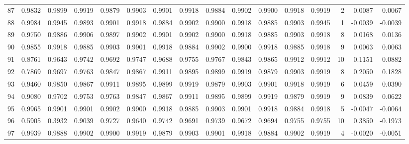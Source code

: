 \begin{tabular}{lrrrrrrrrrrrrrrr}
87  &      0.9832 &  0.9899 &  0.9919 &  0.9879 &  0.9903 &  0.9901 &  0.9918 &  0.9884 &  0.9902 &  0.9900 &   0.9918 &     0.9919 &      2 &                    0.0087 &                     0.0067 \\
88  &      0.9984 &  0.9945 &  0.9893 &  0.9901 &  0.9918 &  0.9884 &  0.9902 &  0.9900 &  0.9918 &  0.9885 &   0.9903 &     0.9945 &      1 &                   -0.0039 &                    -0.0039 \\
89  &      0.9750 &  0.9886 &  0.9906 &  0.9897 &  0.9902 &  0.9901 &  0.9902 &  0.9900 &  0.9918 &  0.9885 &   0.9903 &     0.9918 &      8 &                    0.0168 &                     0.0136 \\
90  &      0.9855 &  0.9918 &  0.9885 &  0.9903 &  0.9901 &  0.9918 &  0.9884 &  0.9902 &  0.9900 &  0.9918 &   0.9885 &     0.9918 &      9 &                    0.0063 &                     0.0063 \\
91  &      0.8761 &  0.9643 &  0.9742 &  0.9692 &  0.9747 &  0.9688 &  0.9755 &  0.9767 &  0.9843 &  0.9865 &   0.9912 &     0.9912 &     10 &                    0.1151 &                     0.0882 \\
92  &      0.7869 &  0.9697 &  0.9763 &  0.9847 &  0.9867 &  0.9911 &  0.9895 &  0.9899 &  0.9919 &  0.9879 &   0.9903 &     0.9919 &      8 &                    0.2050 &                     0.1828 \\
93  &      0.9460 &  0.9850 &  0.9867 &  0.9911 &  0.9895 &  0.9899 &  0.9919 &  0.9879 &  0.9903 &  0.9901 &   0.9918 &     0.9919 &      6 &                    0.0459 &                     0.0390 \\
94  &      0.9080 &  0.9702 &  0.9753 &  0.9763 &  0.9847 &  0.9867 &  0.9911 &  0.9895 &  0.9899 &  0.9919 &   0.9879 &     0.9919 &      9 &                    0.0839 &                     0.0622 \\
95  &      0.9965 &  0.9901 &  0.9901 &  0.9902 &  0.9900 &  0.9918 &  0.9885 &  0.9903 &  0.9901 &  0.9918 &   0.9884 &     0.9918 &      5 &                   -0.0047 &                    -0.0064 \\
96  &      0.5905 &  0.3932 &  0.9039 &  0.9727 &  0.9640 &  0.9742 &  0.9691 &  0.9739 &  0.9672 &  0.9694 &   0.9755 &     0.9755 &     10 &                    0.3850 &                    -0.1973 \\
97  &      0.9939 &  0.9888 &  0.9902 &  0.9900 &  0.9919 &  0.9879 &  0.9903 &  0.9901 &  0.9918 &  0.9884 &   0.9902 &     0.9919 &      4 &                   -0.0020 &                    -0.0051 \\

\end{tabular}
